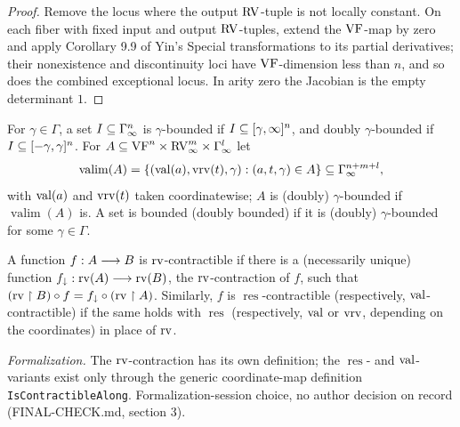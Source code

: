 \begin{proof}
\leanok
Remove the locus where the output $\mathrm{RV}$-tuple is not locally constant. On each fiber with fixed input and output $\mathrm{RV}$-tuples, extend the $\mathrm{VF}$-map by zero and apply Corollary 9.9 of Yin's Special transformations to its partial derivatives; their nonexistence and discontinuity loci have $\mathrm{VF}$-dimension less than $n$, and so does the combined exceptional locus. In arity zero the Jacobian is the empty determinant $1$.
\end{proof}

\setcounter{theorem}{38}
\begin{definition}
\label{bounded}
\leanok
{}
For $\gamma \in \Gamma$, a set $I \subseteq \Gamma_\infty^n$ is $\gamma$-bounded if $I \subseteq [\gamma, \infty]^n$, and doubly $\gamma$-bounded if $I \subseteq [-\gamma, \gamma]^n$. For $A \subseteq \mathrm{VF}^n \times \mathrm{RV}_\infty^m \times \Gamma_\infty^l$ let
\[ \operatorname{valim}(A) = \{(\operatorname{val}(a), \operatorname{vrv}(t), \gamma) : (a, t, \gamma) \in A\} \subseteq \Gamma_\infty^{n+m+l}, \]
with $\operatorname{val}(a)$ and $\operatorname{vrv}(t)$ taken coordinatewise; $A$ is (doubly) $\gamma$-bounded if $\operatorname{valim}(A)$ is. A set is bounded (doubly bounded) if it is (doubly) $\gamma$-bounded for some $\gamma \in \Gamma$.
\end{definition}

\setcounter{theorem}{39}
\begin{definition}[Contractions]
\label{defn-corr-cont}
\leanok
A function $f : A \longrightarrow B$ is $\operatorname{rv}$-contractible if there is a (necessarily unique) function $f_{\downarrow} : \operatorname{rv}(A) \longrightarrow \operatorname{rv}(B)$, the $\operatorname{rv}$-contraction of $f$, such that $(\operatorname{rv} \upharpoonright B) \circ f = f_{\downarrow} \circ (\operatorname{rv} \upharpoonright A)$. Similarly, $f$ is $\operatorname{res}$-contractible (respectively, $\operatorname{val}$-contractible) if the same holds with $\operatorname{res}$ (respectively, $\operatorname{val}$ or $\operatorname{vrv}$, depending on the coordinates) in place of $\operatorname{rv}$.

\emph{Formalization.} The $\operatorname{rv}$-contraction has its own definition; the $\operatorname{res}$- and $\operatorname{val}$-variants exist only through the generic coordinate-map definition \texttt{IsContractibleAlong}. Formalization-session choice, no author decision on record (FINAL-CHECK.md, section 3).
\end{definition}

